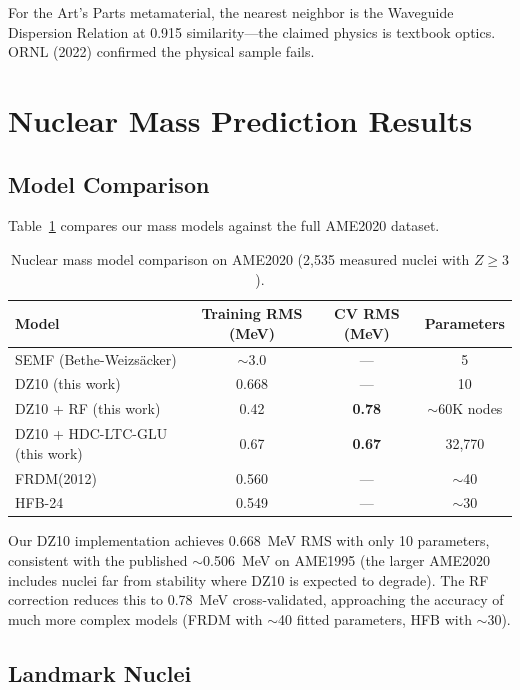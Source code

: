 \documentclass[letterpaper,11pt]{article}
\begin{document}
For the Art's Parts metamaterial, the nearest neighbor is the Waveguide
Dispersion Relation at 0.915 similarity---the claimed physics is textbook
optics. ORNL (2022) confirmed the physical sample fails.

\section{Nuclear Mass Prediction Results}

\subsection{Model Comparison}

Table~\ref{tab:mass_comparison} compares our mass models against the full
AME2020 dataset.

\begin{table}[h]
\centering
\caption{Nuclear mass model comparison on AME2020 (2,535 measured nuclei with $Z \geq 3$).}
\label{tab:mass_comparison}
\begin{tabular}{lccc}
\toprule
Model & Training RMS (MeV) & CV RMS (MeV) & Parameters \\
\midrule
SEMF (Bethe-Weizs\"acker) & $\sim$3.0 & --- & 5 \\
DZ10 (this work) & 0.668 & --- & 10 \\
DZ10 + RF (this work) & 0.42 & \textbf{0.78} & $\sim$60K nodes \\
DZ10 + HDC-LTC-GLU (this work) & 0.67 & \textbf{0.67} & 32,770 \\
FRDM(2012) \citep{moller2016} & 0.560 & --- & $\sim$40 \\
HFB-24 \citep{goriely2013} & 0.549 & --- & $\sim$30 \\
\bottomrule
\end{tabular}
\end{table}

Our DZ10 implementation achieves 0.668~MeV RMS with only 10 parameters,
consistent with the published $\sim$0.506~MeV on AME1995 (the larger AME2020
includes nuclei far from stability where DZ10 is expected to degrade). The RF
correction reduces this to 0.78~MeV cross-validated, approaching the accuracy of
much more complex models (FRDM with $\sim$40 fitted parameters, HFB with
$\sim$30).

\subsection{Landmark Nuclei}
\end{document}
